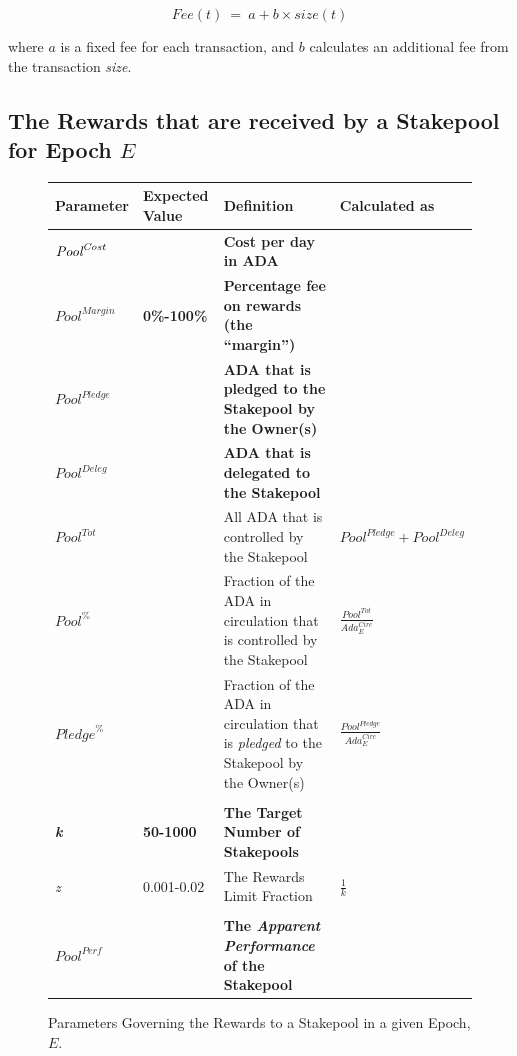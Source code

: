 \documentclass[11pt,a4paper,dvipsnames,twosided,final]{article}
\newcommand{\ada}{ADA{}}
\begin{document}
$$
\textit{Fee} (t) ~=~ a + b \times \textit{size}(t)
$$

\noindent
where $a$ is a fixed fee for each transaction, and $b$ calculates an additional fee from the transaction \emph{size}.

\clearpage
\subsection{The Rewards that are received by a Stakepool for Epoch $E$}

\begin{figure}[h!]
\begin{center}
\begin{tabular}{||l|l|p{6cm}|l||}
  \hline \hline
\textbf{Parameter} & \textbf{Expected Value} & \textbf{Definition} & \textbf{Calculated as} \\\hline
\textbf{\color{red} $\textit{\textit{Pool}}^{\textit{Cost}}$} &  & \textbf{\color{red} Cost per day in \ada{}} & \\\hline
\textbf{\color{red} ${\textit{Pool}}^{\textit{Margin}}$} &  \textbf{\color{red} 0\%-100\%} & \textbf{\color{red} Percentage fee on rewards (the ``margin'')} & \\\hline
\textbf{\color{red} ${Pool}^\textit{Pledge}$} & & \textbf{\color{red} \ada{} that is pledged to the Stakepool by the Owner(s)} & \\\hline
\textbf{\color{blue} ${\textit{Pool}}^\textit{Deleg}$} & & \textbf{\color{blue} \ada{} that is delegated to the Stakepool} & \\\hline
${\textit{Pool}}^{Tot}$ & & All \ada{} that is controlled by the Stakepool & ${\textit{Pool}}^\textit{Pledge} + {\textit{Pool}}^\textit{Deleg}$ \\\hline
${\textit{Pool}}^\%$ & & Fraction of the \ada{} in circulation that is controlled by the Stakepool & {\large $\frac{{\textit{Pool}}^{Tot}}{\textit{Ada}^{\textit{Circ}}_E}$} \\\hline
${\textit{Pledge}}^\%$ & & Fraction of the \ada{} in circulation that is \emph{pledged} to the Stakepool by the Owner(s) & {\large $\frac{{\textit{Pool}}^{Pledge}}{\textit{Ada}^{\textit{Circ}}_E}$} \\\hline
&&&  \\\hline
\textbf{\color{green} \emph{k}} & \textbf{\color{green} 50-1000} & \textbf{\color{green} The Target Number of Stakepools} & \\\hline
\emph{z} & 0.001-0.02 & The Rewards Limit Fraction & $\frac{1}{k}$ \\\hline
&&&  \\\hline
\textbf{\color{cyan} $\textit{Pool}^{\textit{Perf}}$} & & \textbf{\color{cyan} The \emph{Apparent Performance} of the Stakepool} & \\\hline
  \hline
\end{tabular}
\end{center}
\caption{Parameters Governing the Rewards to a Stakepool in a given Epoch, $E$.}
\label{fig:rewards}
\end{figure}
\end{document}
